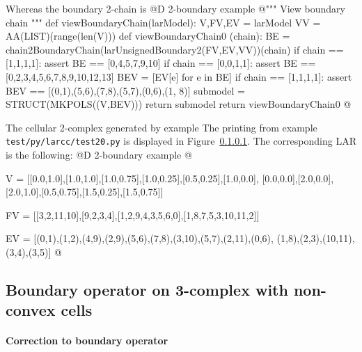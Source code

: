\documentclass[11pt,oneside]{article}    %
\begin{document}
Whereas the boundary 2-chain is
@D 2-boundary example
@{""" View boundary chain """
def viewBoundaryChain(larModel):
    V,FV,EV = larModel
    VV = AA(LIST)(range(len(V)))
    def viewBoundaryChain0 (chain):
        BE = chain2BoundaryChain(larUnsignedBoundary2(FV,EV,VV))(chain)
        if chain == [1,1,1,1]: assert BE == [0,4,5,7,9,10]
        if chain == [0,0,1,1]: assert BE == [0,2,3,4,5,6,7,8,9,10,12,13]
        BEV = [EV[e] for e in BE]
        if chain == [1,1,1,1]: assert BEV == [(0,1),(5,6),(7,8),(5,7),(0,6),(1, 8)]
        submodel = STRUCT(MKPOLS((V,BEV)))
        return submodel
    return viewBoundaryChain0
@}

The cellular 2-complex generated by example \texttt{}The printing from example \texttt{test/py/larcc/test20.py} is displayed in Figure~\ref{}.
The corresponding LAR is the following:
@D 2-boundary example
@{V = [[0.0,1.0],[1.0,1.0],[1.0,0.75],[1.0,0.25],[0.5,0.25],[1.0,0.0],
[0.0,0.0],[2.0,0.0],[2.0,1.0],[0.5,0.75],[1.5,0.25],[1.5,0.75]]

FV = [[3,2,11,10],[9,2,3,4],[1,2,9,4,3,5,6,0],[1,8,7,5,3,10,11,2]]

EV = [(0,1),(1,2),(4,9),(2,9),(5,6),(7,8),(3,10),(5,7),(2,11),(0,6),
(1,8),(2,3),(10,11),(3,4),(3,5)]
@}


\subsection{Boundary operator on 3-complex with non-convex cells}

\paragraph{Correction to boundary operator}
\end{document}
